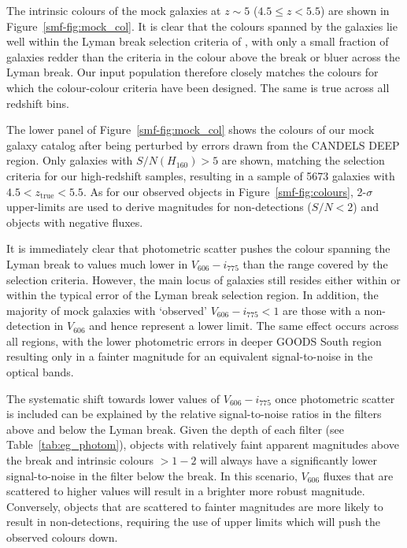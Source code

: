 The intrinsic colours of the mock galaxies at $z \sim 5$ ($4.5 \leq z < 5.5$) are shown in Figure~\ref{smf-fig:mock_col}. It is clear that the colours spanned by the galaxies lie well within the Lyman break selection criteria of \citet{2007ApJ...670..928B}, with only a small fraction of galaxies redder than the criteria in the colour above the break or bluer across the Lyman break. Our input population therefore closely matches the colours for which the colour-colour criteria have been designed. The same is true across all redshift bins. 

The lower panel of Figure~\ref{smf-fig:mock_col} shows the colours of our mock galaxy catalog after being perturbed by errors drawn from the CANDELS DEEP region. Only galaxies with $S/N(H_{160}) > 5$ are shown, matching the selection criteria for our high-redshift samples, resulting in a sample of 5673 galaxies with $4.5 < z_{\text{true}} < 5.5$. As for our observed objects in Figure~\ref{smf-fig:colours}, 2-$\sigma$ upper-limits are used to derive magnitudes for non-detections ($S/N < 2$) and objects with negative fluxes.  

It is immediately clear that photometric scatter pushes the colour spanning the Lyman break to values much lower in $V_{606} - i_{775}$ than the range covered by the selection criteria. However, the main locus of galaxies still resides either within or within the typical error of the Lyman break selection region. In addition, the majority of mock galaxies with `observed' $V_{606} - i_{775} < 1$ are those with a non-detection in $V_{606}$ and hence represent a lower limit. The same effect occurs across all regions, with the lower photometric errors in deeper GOODS South region resulting only in a fainter magnitude for an equivalent signal-to-noise in the optical bands. 

The systematic shift towards lower values of $V_{606} - i_{775}$ once photometric scatter is included can be explained by the relative signal-to-noise ratios in the filters above and below the Lyman break. Given the depth of each filter (see Table~\ref{tab:eg_photom}), objects with relatively faint apparent magnitudes above the break and intrinsic colours $> 1-2$ will always have a significantly lower signal-to-noise in the filter below the break. In this scenario, $V_{606}$ fluxes that are scattered to higher values will result in a brighter more robust magnitude. Conversely, objects that are scattered to fainter magnitudes are more likely to result in non-detections, requiring the use of upper limits which will push the observed colours down.

